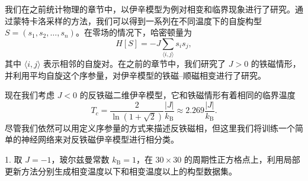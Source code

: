 \begin{exerciseBox}
我们在之前统计物理的章节中，以伊辛模型为例对相变和临界现象进行了研究。通过蒙特卡洛采样的方法，我们可以得到一系列在不同温度下的自旋构型 $S=(s_1,s_2,\ldots,s_n)$。在零场的情况下，哈密顿量为
\begin{equation}
H[S]=-J\sum_{\langle i,j\rangle}s_i s_j,
\tag{1}
\end{equation}
其中 $\langle i,j\rangle$ 表示相邻的自旋对。在之前的章节中，我们研究了 $J>0$ 的铁磁情形，并利用平均自旋这个序参量，对伊辛模型的铁磁--顺磁相变进行了研究。

现在我们考虑 $J<0$ 的反铁磁二维伊辛模型，它和铁磁情形有着相同的临界温度
\begin{equation}
T_c=\frac{2}{\ln(1+\sqrt2)}\frac{|J|}{k_{\mathrm B}}\approx2.269\frac{|J|}{k_{\mathrm B}}.
\tag{2}
\end{equation}
尽管我们依然可以用定义序参量的方式来描述反铁磁相，但这里我们将训练一个简单的神经网络来对反铁磁伊辛模型进行相分类。

1. 取 $J=-1$，玻尔兹曼常数 $k_{\mathrm B}=1$，在 $30\times30$ 的周期性正方格点上，利用局部更新方法分别生成相变温度以下和相变温度以上的构型数据集。
\end{exerciseBox}

